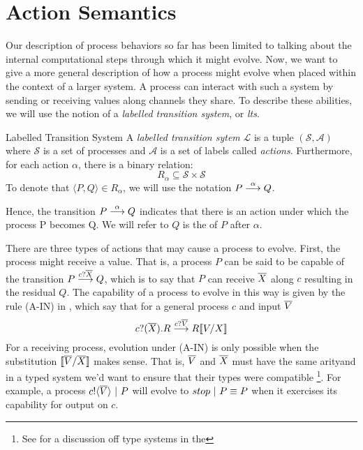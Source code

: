 \section{Action Semantics}\label{secactionsemantics}
Our description of process behaviors so far has been limited to talking about the internal computational steps through which it might evolve.  
Now, we want to give a more general description of how a process might evolve when placed within the context of a larger system.  
A process can interact with such a system by sending or receiving values along channels they share.  
To describe these abilities, we will use the notion of a \emph{labelled transition system}, or \emph{lts}.

\begin{definition}{Labelled Transition System}
	A \emph{labelled transition sytem} $\mathcal{L}$ is a tuple $(\mathcal{S}, \mathcal{A})$ 
where $\mathcal{S}$ is a set of processes and $\mathcal{A}$ is a set of labels called \emph{actions}.  
Furthermore, for each action $\alpha$, there is a binary relation:
	\[
		R_{\alpha} \subseteq \mathcal{S} \times \mathcal{S}
	\]
	To denote that $\langle P,Q\rangle \in R_{\alpha}$, we will use the notation $P \overset{{\alpha}}{\longrightarrow} Q$.
\end{definition}
Hence, the transition $P \overset{{\alpha}}{\longrightarrow} Q$ indicates that there is an action under which the process P becomes Q.  
We will refer to $Q$ is the  of $P$ after $\alpha$.

There are three types of actions that may cause a process to evolve.  
First, the process might receive a value.  
That is, a process $P$ can be said to be capable of the transition $P \overset{{{c}?{\overline{X}}}}{\longrightarrow} Q$, which is to say that $P$ can receive $\overline{X}$ along $c$ resulting in the residual $Q$.  The capability of a process to evolve in this way is given by the rule (A-IN) in , which say that for a general process $c$ and input $\overline{V}$
\[
	{c}?({\overline{X}}).R \overset{{{c}?{\overline{V}}}}{\longrightarrow} R\llbracket{V}/{X}\rrbracket
\]
For a receiving process, evolution under (A-IN) is only possible when the substitution $\llbracket{ \ensuremath{\overline{V}} }/{\overline{X}}\rrbracket$ makes sense.  That is, $\overline{V}$ and $\overline{X}$ must have the same arityand in a typed system we'd want to ensure that their types were compatible
\footnote{See \cite{henn07} for a discussion off type systems in the \picalc}.
For example, a process ${c}!\langle{ \ensuremath{\overline{V}} }\rangle \ |\  P$ will evolve to $stop \ |\  P \equiv P$ when it exercises its capability for output on $c$.  

